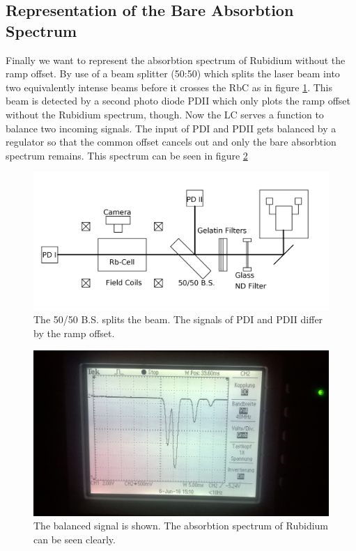 \subsection{Representation of the Bare Absorbtion Spectrum}
Finally we want to represent the absorbtion spectrum of Rubidium without the ramp offset. By use of a beam splitter (50:50) which splits the laser beam
into two equivalently intense beams before it crosses the RbC as in figure \ref{pic_setup3}. This beam is detected by a second photo diode PDII which only
plots the ramp offset without the Rubidium spectrum, though. Now the LC serves a function to balance two incoming signals. The input of PDI and PDII gets
balanced by a regulator so that the common offset cancels out and only the bare absorbtion spectrum remains. This spectrum can be seen in figure 
\ref{pic_spectrum}
\begin{figure}[H]
 \includegraphics[width=\textwidth]{../pics/setup3.png}
 \caption{The 50/50 B.S. splits the beam. The signals of PDI and PDII differ by the ramp offset.}
 \label{pic_setup3}
\end{figure}

\begin{figure}[H]
 \includegraphics[width=\textwidth]{../pics/spectrum.jpg}
 \caption{The balanced signal is shown. The absorbtion spectrum of Rubidium can be seen clearly.}
 \label{pic_spectrum}
\end{figure}

